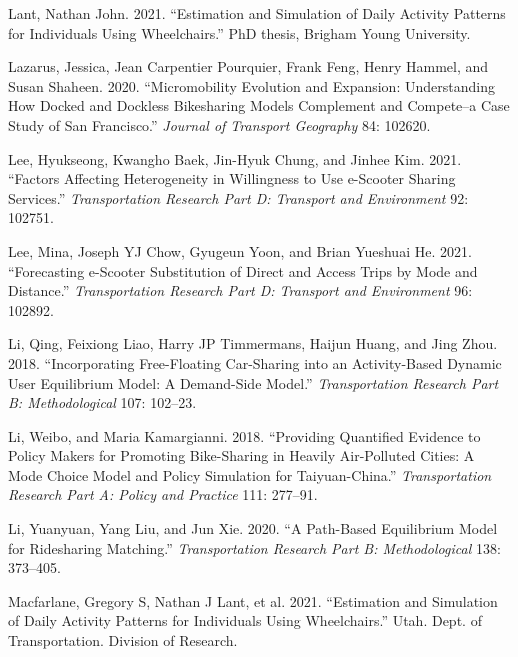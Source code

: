 \documentclass[12pt, oneside, openright]{byuthesis}
\newlength{\cslhangindent}
\newlength{\cslentryspacingunit} %
\newenvironment{CSLReferences}[2] %
 {%
  \setlength{\parindent}{0pt}
  \ifodd #1
  \let\oldpar\par
  \def\par{\hangindent=\cslhangindent\oldpar}
  \fi
  \setlength{\parskip}{#2\cslentryspacingunit}
 }%
 {}
\begin{document}
\begin{CSLReferences}{1}{0}
\leavevmode{}%
Lant, Nathan John. 2021. {``Estimation and Simulation of Daily Activity Patterns for Individuals Using Wheelchairs.''} PhD thesis, Brigham Young University.

\leavevmode{}%
Lazarus, Jessica, Jean Carpentier Pourquier, Frank Feng, Henry Hammel, and Susan Shaheen. 2020. {``Micromobility Evolution and Expansion: Understanding How Docked and Dockless Bikesharing Models Complement and Compete--a Case Study of San Francisco.''} \emph{Journal of Transport Geography} 84: 102620.

\leavevmode{}%
Lee, Hyukseong, Kwangho Baek, Jin-Hyuk Chung, and Jinhee Kim. 2021. {``Factors Affecting Heterogeneity in Willingness to Use e-Scooter Sharing Services.''} \emph{Transportation Research Part D: Transport and Environment} 92: 102751.

\leavevmode{}%
Lee, Mina, Joseph YJ Chow, Gyugeun Yoon, and Brian Yueshuai He. 2021. {``Forecasting e-Scooter Substitution of Direct and Access Trips by Mode and Distance.''} \emph{Transportation Research Part D: Transport and Environment} 96: 102892.

\leavevmode{}%
Li, Qing, Feixiong Liao, Harry JP Timmermans, Haijun Huang, and Jing Zhou. 2018. {``Incorporating Free-Floating Car-Sharing into an Activity-Based Dynamic User Equilibrium Model: A Demand-Side Model.''} \emph{Transportation Research Part B: Methodological} 107: 102--23.

\leavevmode{}%
Li, Weibo, and Maria Kamargianni. 2018. {``Providing Quantified Evidence to Policy Makers for Promoting Bike-Sharing in Heavily Air-Polluted Cities: A Mode Choice Model and Policy Simulation for Taiyuan-China.''} \emph{Transportation Research Part A: Policy and Practice} 111: 277--91.

\leavevmode{}%
Li, Yuanyuan, Yang Liu, and Jun Xie. 2020. {``A Path-Based Equilibrium Model for Ridesharing Matching.''} \emph{Transportation Research Part B: Methodological} 138: 373--405.

\leavevmode{}%
Macfarlane, Gregory S, Nathan J Lant, et al. 2021. {``Estimation and Simulation of Daily Activity Patterns for Individuals Using Wheelchairs.''} Utah. Dept. of Transportation. Division of Research.


\end{CSLReferences}
\end{document}
